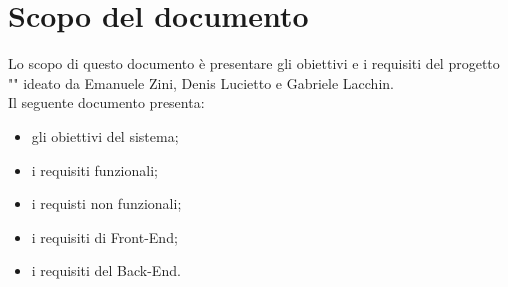 \section*{Scopo del documento}
Lo scopo di questo documento è presentare gli obiettivi e i requisiti del progetto "\nome" ideato da Emanuele Zini, Denis Lucietto e Gabriele Lacchin.\\
Il seguente documento presenta:
\begin{itemize}
    \item gli obiettivi del sistema;
    \item i requisiti funzionali;
    \item i requisti non funzionali;
    \item i requisiti di Front-End;
    \item i requisiti del Back-End.
\end{itemize}